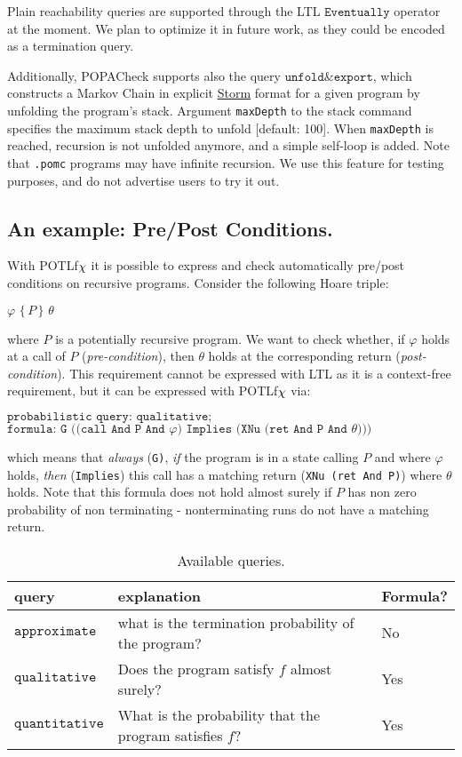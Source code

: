 \documentclass[9pt,a4paper]{article}
\begin{document}
Plain reachability queries are supported through the LTL $\texttt{Eventually}$ operator at the moment. We plan to optimize it in future work, as they could be encoded as a termination query. 

Additionally, POPACheck supports also the query $\texttt{unfold\&export}$, which constructs a Markov Chain in explicit \href{https://www.stormchecker.org/documentation/background/languages.html}{Storm} format for a given program by unfolding the program's stack. Argument \verb|maxDepth| to the stack command specifies the maximum stack depth to unfold [default: 100]. When \verb|maxDepth| is reached, recursion is not unfolded anymore, and a simple self-loop is added. Note that \verb|.pomc| programs may have infinite recursion. We use this feature for testing purposes, and do not advertise users to try it out.

\subsection{An example: Pre/Post Conditions.}
With POTLf$\chi$ it is possible to express and check automatically pre/post conditions on recursive programs. Consider the following Hoare triple:
\begin{center}
    $\varphi \, \, \{ \, P \, \} \,\, \theta$
\end{center}
where $P$ is a potentially recursive program. We want to check whether, if $\varphi$ holds at a call of $P$ (\emph{pre-condition}), then $\theta$ holds at the corresponding return (\emph{post-condition}). This requirement cannot be expressed with LTL as it is a context-free requirement, but it can be expressed with POTLf$\chi$ via: 
\begin{center}
    $\texttt{probabilistic query: qualitative;}$
    $\texttt{formula: G ((call And P And } \varphi \texttt{) Implies (XNu (ret And P And } \theta \texttt{)))}$
\end{center}
which means that \emph{always} (\texttt{G)}, \emph{if} the program is in a state calling $P$ and where $\varphi$ holds, \emph{then} (\texttt{Implies}) this call has a matching return (\texttt{XNu (ret And P)}) where $\theta$ holds. Note that this formula does not hold almost surely if $P$ has non zero probability of non terminating - nonterminating runs do not have a matching return.

\begin{table}
\centering
\begin{tabular}{| l | l | l |}
\hline
 query & explanation & Formula? \\
\hline
\hline
$\texttt{approximate}$ & what is the termination probability of the program? & No \\ 
$\texttt{qualitative}$ & Does the program satisfy $f$ almost surely? & Yes \\ 
$\texttt{quantitative}$ & What is the probability that the program satisfies $f$? & Yes \\ 
\hline
\end{tabular}
\caption{Available queries.}
\label{tab:queries}
\end{table}
\end{document}
